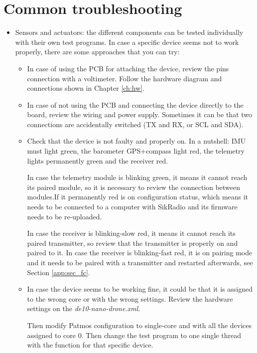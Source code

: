 \section*{Common troubleshooting}

\begin{itemize}
    \item Sensors and actuators: the different components can be tested individually with their own test programs. In case a specific device seems not to work properly, there are some approaches that you can try:
    \begin{itemize}
        \item In case of using the PCB for attaching the device, review the pins connection with a voltimeter. Follow the hardware diagram and connections shown in Chapter \ref{ch:hw}.
        
        \item In case of not using the PCB and connecting the device directly to the board, review the wiring and power supply. Sometimes it can be that two connections are accidentally switched (TX and RX, or SCL and SDA).
        
        \item Check that the device is not faulty and properly on. In a nutshell: IMU must light green, the barometer GPS+compass light red, the telemetry lights permanently green and the receiver red.
        
        In case the telemetry module is blinking green, it means it cannot reach its paired module, so it is necessary to review the connection between modules.If it permanently red is on configuration status, which means it needs to be connected to a computer with SikRadio \cite{bib:ardupilot} and its firmware needs to be re-uploaded. 
        
        In case the receiver is blinking-slow red, it means it cannot reach its paired transmitter, so review that the transmitter is properly on and paired to it. In case the receiver is blinking-fast red, it is on pairing mode and it needs to be paired with a transmitter and restarted afterwards, see Section \ref{app:sec_fc}.
        
        \item In case the device seems to be working fine, it could be that it is assigned to the wrong core or with the wrong settings. Review the hardware settings on the \textit{de10-nano-drone.xml}.
        
        Then modify Patmos configuration to single-core and with all the devices assigned to core 0. Then change the test program to one single thread with the function for that specific device.
    \end{itemize}
    

\end{itemize}
